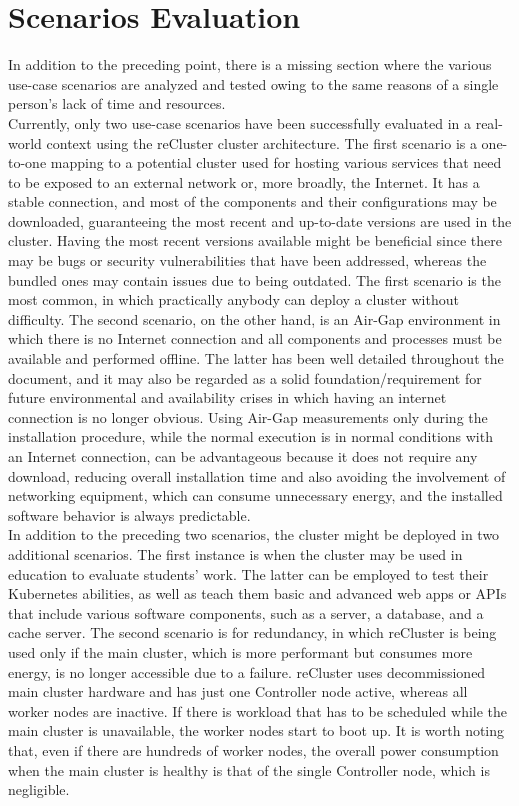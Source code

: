 \section{Scenarios Evaluation}
\label{subsec:conclusions_limitations_and_future_works_scenarios_evaluation}

In addition to the preceding point, there is a missing section where the various
use-case scenarios are analyzed and tested owing to the same reasons of a single
person's lack of time and resources. \\ %
Currently, only two use-case scenarios have been successfully evaluated in a
real-world context using the reCluster cluster architecture. The first scenario is
a one-to-one mapping to a potential cluster used for hosting various services that
need to be exposed to an external network or, more broadly, the Internet. It has
a stable connection, and most of the components and their configurations may be downloaded,
guaranteeing the most recent and up-to-date versions are used in the cluster. Having
the most recent versions available might be beneficial since there may be bugs or
security vulnerabilities that have been addressed, whereas the bundled ones may
contain issues due to being outdated. The first scenario is the most common, in
which practically anybody can deploy a cluster without difficulty. The second scenario,
on the other hand, is an Air-Gap environment in which there is no Internet connection
and all components and processes must be available and performed offline. The
latter has been well detailed throughout the document, and it may also be regarded
as a solid foundation/requirement for future environmental and availability crises
in which having an internet connection is no longer obvious. Using Air-Gap
measurements only during the installation procedure, while the normal execution is
in normal conditions with an Internet connection, can be advantageous because it
does not require any download, reducing overall installation time and also avoiding
the involvement of networking equipment, which can consume unnecessary energy, and
the installed software behavior is always predictable. \\ %
In addition to the preceding two scenarios, the cluster might be deployed in two
additional scenarios. The first instance is when the cluster may be used in education
to evaluate students' work. The latter can be employed to test their Kubernetes abilities,
as well as teach them basic and advanced web apps or APIs that include various
software components, such as a server, a database, and a cache server. The
second scenario is for redundancy, in which reCluster is being used only if the main
cluster, which is more performant but consumes more energy, is no longer accessible
due to a failure. reCluster uses decommissioned main cluster hardware and has
just one Controller node active, whereas all worker nodes are inactive. If there
is workload that has to be scheduled while the main cluster is unavailable, the worker
nodes start to boot up. It is worth noting that, even if there are hundreds of worker
nodes, the overall power consumption when the main cluster is healthy is that of
the single Controller node, which is negligible.

